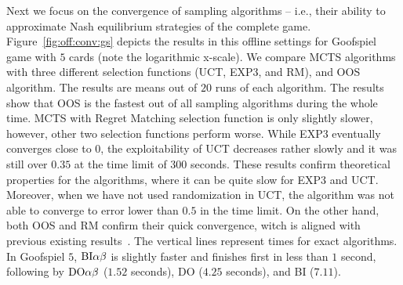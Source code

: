 Next we focus on the convergence of sampling algorithms -- i.e., their ability to approximate Nash equilibrium strategies of the complete game. 
Figure~\ref{fig:off:conv:gs} depicts the results in this offline settings for Goofspiel game with $5$ cards (note the logarithmic x-scale).
We compare MCTS algorithms with three different selection functions (UCT, EXP3, and RM), and OOS algorithm. 
The results are means out of $20$ runs of each algorithm.
The results show that OOS is the fastest out of all sampling algorithms during the whole time. 
MCTS with Regret Matching selection function is only slightly slower, however, other two selection functions perform worse. 
While EXP3 eventually converges close to $0$, the exploitability of UCT decreases rather slowly and it was still over $0.35$ at the time limit of $300$ seconds. 
These results confirm theoretical properties for the algorithms, where it can be quite slow for EXP3 and UCT.
Moreover, when we have not used randomization in UCT, the algorithm was not able to converge to error lower than $0.5$ in the time limit. 
On the other hand, both OOS and RM confirm their quick convergence, witch is aligned with previous existing results~\cite{Lanctot13Goofspiel}.
The vertical lines represent times for exact algorithms.
In Goofspiel $5$, $\textrm{BI}\alpha\beta$ is slightly faster and finishes first in less than $1$ second, following by $\textrm{DO}\alpha\beta$ ($1.52$ seconds), \textsc{DO} ($4.25$ seconds), and \textsc{BI} ($7.11$).


